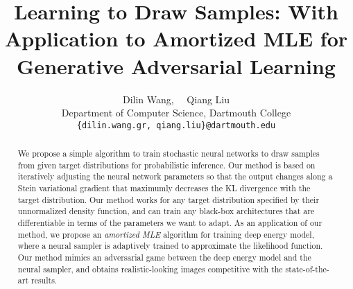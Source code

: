 \documentclass{article} %
\title{Learning to Draw Samples: With Application to Amortized MLE for Generative Adversarial Learning} %
\author{Dilin Wang, ~~Qiang Liu\\
Department of Computer Science, Dartmouth College\\
\texttt{\{dilin.wang.gr, qiang.liu\}@dartmouth.edu}
}
\begin{document}
\maketitle


\begin{abstract}
We propose a simple algorithm to train stochastic 
neural networks 
to draw samples from given target distributions for probabilistic inference. 
Our method is based on iteratively adjusting the neural network parameters 
so that the output changes along a Stein variational gradient \citep{liu2016stein} that maximumly decreases 
the KL divergence with the target distribution. 
Our method works for any target distribution specified by their unnormalized density function, 
and can train any black-box architectures that are differentiable in terms of the parameters we want to adapt. 
As an application of our method, we propose an  \emph{amortized MLE} algorithm for training deep energy model, where a neural sampler is adaptively trained to 
approximate the likelihood function. Our method mimics an adversarial game 
between the deep energy model and the neural sampler, and obtains realistic-looking images competitive with the state-of-the-art results. 
\end{abstract}
\end{document}
